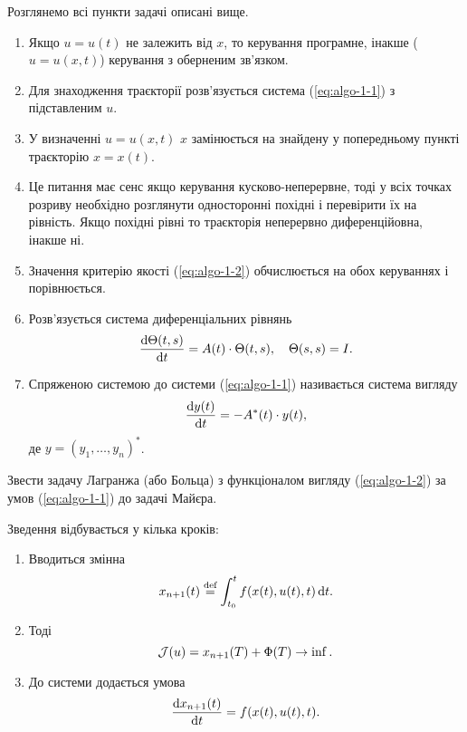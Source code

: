 \begin{algorithm}
    \label{algo-1-1}
	Розглянемо всі пункти задачі описані вище.
	\begin{enumerate}
		\item Якщо $u = u(t)$ не залежить від $x$, то керування програмне, інакше ($u = u(x, t)$) керування з оберненим зв'язком.
		\item Для знаходження траєкторії %
		розв'язується система (\ref{eq:algo-1-1}) з підставленим $u$.
		\item У визначенні $u = u(x, t)$ $x$ замінюється на знайдену у попередньому пункті траєкторію $x = x(t)$.
		\item Це питання має сенс якщо керування кусково-неперервне, тоді у всіх точках розриву %
		необхідно розглянути односторонні похідні і перевірити їх на рівність. Якщо похідні рівні то траєкторія неперервно диференційовна, інакше ні.
		\item Значення критерію якості (\ref{eq:algo-1-2}) обчислюється на обох керуваннях і порівнюється.
		\item Розв'язується система диференціальних рівнянь 
		\begin{equation}
		    \label{eq:algo-1-3}
		    \frac{\mathop{}\!\mathrm{d} \Theta(t, s)}{\mathop{}\!\mathrm{d} t} = A(t) \cdot \Theta(t, s), \quad \Theta(s, s) = I.
		\end{equation}
		\item Спряженою системою до системи (\ref{eq:algo-1-1}) називається система вигляду
		\begin{equation}
		    \label{eq:algo-1-4}
		    \frac{\mathop{}\!\mathrm{d} y(t)}{\mathop{}\!\mathrm{d} t} = - A^*(t) \cdot y(t),
		\end{equation}
		де $y = (y_1, \ldots, y_n)^*$.
	\end{enumerate}
\end{algorithm}

\vspace*{\baselineskip}

\begin{problem*}
	Звести задачу Лагранжа (або Больца) з функціоналом вигляду (\ref{eq:algo-1-2}) за умов (\ref{eq:algo-1-1}) до задачі Майєра.
\end{problem*}

\begin{algorithm}
    \label{algo-1-2}
    Зведення відбувається у кілька кроків:
	\begin{enumerate}
		\item Вводиться змінна \[x_{n+1} (t) \overset{\text{def}}{=} \int_{t_0}^t f(x(t), u(t), t) \mathop{}\!\mathrm{d} t.\]
		\item Тоді \[ \mathcal{J}(u) = x_{n+1} (T) + \Phi(T) \to \inf. \]
		\item До системи додається умова \[ \frac{\mathop{}\!\mathrm{d} x_{n+1}(t)}{\mathop{}\!\mathrm{d} t} = f(x(t), u(t), t). \]
	\end{enumerate}
\end{algorithm}
